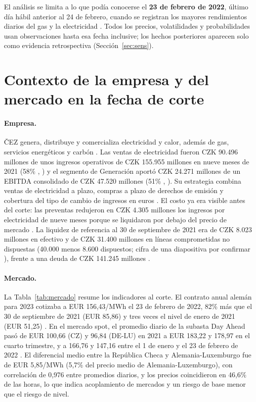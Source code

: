 \documentclass[11pt,letterpaper]{article}
\theoremstyle{plain}
\theoremstyle{definition}
\theoremstyle{remark}
\numberwithin{equation}{section}
\begin{document}
El análisis se limita a lo que podía conocerse el \textbf{23 de febrero de 2022}, 
último día hábil anterior al 24 de febrero, cuando se registran los mayores rendimientos 
diarios del gas y la electricidad \parencite[p.~3]{GIANNOZZI2026107700}. Todos los precios, 
volatilidades y probabilidades usan observaciones hasta esa fecha inclusive; los hechos 
posteriores aparecen solo como evidencia retrospectiva (Sección~\ref{sec:sens}). 

\section{Contexto de la empresa y del mercado en la fecha de corte}

\paragraph{Empresa.} ČEZ genera, distribuye y comercializa electricidad y calor, 
además de gas, servicios energéticos y carbón \parencite[p.~10]{cez_interim_q3_2021}. 
Las ventas de electricidad fueron CZK 90.496 millones de unos ingresos operativos de 
CZK 155.955 millones en nueve meses de 2021 (58\% , \parencite[p.~21]{cez_interim_q3_2021}) 
y el segmento de Generación aportó CZK 24.271 millones de un EBITDA consolidado de 
CZK 47.520 millones (51\% , \parencite[pp.~24--25]{cez_interim_q3_2021}). Su estrategia 
combina ventas de electricidad a plazo, compras a plazo de derechos de emisión y 
cobertura del tipo de cambio de ingresos en euros \parencite{cez_q3_2021}. 
El costo ya era visible antes del corte: las preventas redujeron en CZK 4.305 millones 
los ingresos por electricidad de nueve meses porque se liquidaron por debajo del precio 
de mercado \parencite[p.~21]{cez_interim_q3_2021}. La liquidez de referencia al 30 de 
septiembre de 2021 era de CZK 8.023 millones en efectivo \parencite[p.~2]{cez_interim_q3_2021} 
y de CZK 31.400 millones en líneas comprometidas no dispuestas (40.000 menos 8.600 dispuestos; 
cifra de una diapositiva por confirmar \parencite{cez_q3_2021}), frente a una deuda de 
CZK 141.245 millones \parencite[pp.~3, 19, 20]{cez_interim_q3_2021}.

\paragraph{Mercado.} La Tabla~\ref{tab:mercado} resume los indicadores al corte. 
El contrato anual alemán para 2023 cotizaba a EUR 156,43/MWh el 23 de febrero 
de 2022, 82\% más que el 30 de septiembre de 2021 (EUR 85,86) y tres veces el 
nivel de enero de 2021 (EUR 51,25) . En el mercado spot, el promedio diario de 
la subasta Day Ahead pasó de EUR 100,66 (CZ) y 96,84 (DE-LU) en 2021 a EUR 183,22 
y 178,97 en el cuarto trimestre, y a 166,76 y 147,16 entre el 1 de enero y el 
23 de febrero de 2022 . El diferencial medio entre la República Checa y 
Alemania-Luxemburgo fue de EUR 5,85/MWh (5,7\% del precio medio de Alemania-Luxemburgo), 
con correlación de 0,976 entre promedios diarios, y los precios coincidieron en 46,6\% de 
las horas, lo que indica acoplamiento de mercados y un riesgo de base menor que el riesgo 
de nivel.
\end{document}

